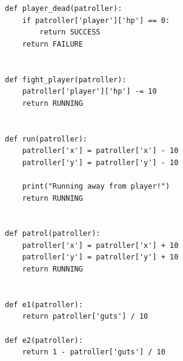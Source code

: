 \documentclass[a4paper,UKenglish,cleveref, autoref, thm-restate]{oasics-v2019}
\begin{document}
\begin{appendices}
\begin{lstlisting}
def player_dead(patroller):
    if patroller['player']['hp'] == 0:
        return SUCCESS
    return FAILURE


def fight_player(patroller):
    patroller['player']['hp'] -= 10
    return RUNNING


def run(patroller):
    patroller['x'] = patroller['x'] - 10
    patroller['y'] = patroller['y'] - 10

    print("Running away from player!")
    return RUNNING


def patrol(patroller):
    patroller['x'] = patroller['x'] + 10
    patroller['y'] = patroller['y'] + 10
    return RUNNING


def e1(patroller):
    return patroller['guts'] / 10

def e2(patroller):
    return 1 - patroller['guts'] / 10
\end{lstlisting}


\end{appendices}
\end{document}
